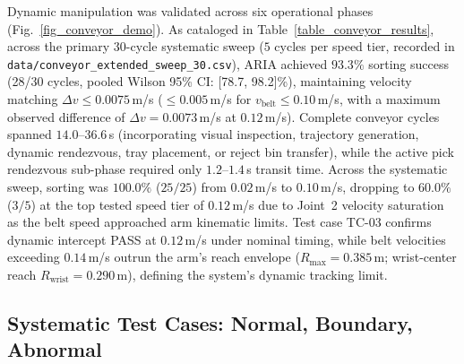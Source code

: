 \documentclass[journal]{IEEEtran}
\begin{document}
Dynamic manipulation was validated across six operational phases (Fig.~\ref{fig_conveyor_demo}). As cataloged in Table~\ref{table_conveyor_results}, across the primary 30-cycle systematic sweep ($5$ cycles per speed tier, recorded in \texttt{data/conveyor\_extended\_sweep\_30.csv}), ARIA achieved $93.3\%$ sorting success (28/30 cycles, pooled Wilson 95\% CI: [78.7, 98.2]\%), maintaining velocity matching $\Delta v \le 0.0075$\,m/s ($\le 0.005$\,m/s for $v_{\text{belt}} \le 0.10$\,m/s, with a maximum observed difference of $\Delta v = 0.0073$\,m/s at $0.12$\,m/s). Complete conveyor cycles spanned $14.0\text{--}36.6$\,s (incorporating visual inspection, trajectory generation, dynamic rendezvous, tray placement, or reject bin transfer), while the active pick rendezvous sub-phase required only $1.2\text{--}1.4$\,s transit time. Across the systematic sweep, sorting was $100.0\%$ ($25/25$) from $0.02$\,m/s to $0.10$\,m/s, dropping to $60.0\%$ ($3/5$) at the top tested speed tier of $0.12$\,m/s due to Joint~2 velocity saturation as the belt speed approached arm kinematic limits. Test case TC-03 confirms dynamic intercept PASS at $0.12$\,m/s under nominal timing, while belt velocities exceeding $0.14$\,m/s outrun the arm's reach envelope ($R_{\text{max}} = 0.385$\,m; wrist-center reach $R_{\text{wrist}} = 0.290$\,m), defining the system's dynamic tracking limit.

\subsection{Systematic Test Cases: Normal, Boundary, Abnormal}
\end{document}
